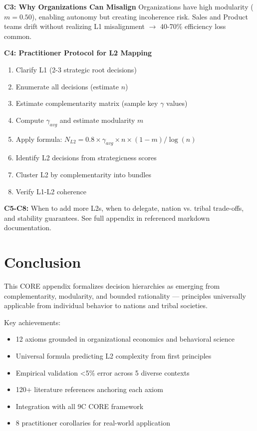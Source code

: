 \textbf{C3: Why Organizations Can Misalign}
Organizations have high modularity ($m = 0.50$), enabling autonomy but creating incoherence risk. Sales and Product teams drift without realizing L1 misalignment $\to$ 40-70\% efficiency loss common.

\textbf{C4: Practitioner Protocol for L2 Mapping}
\begin{enumerate}[nosep]
    \item Clarify L1 (2-3 strategic root decisions)
    \item Enumerate all decisions (estimate $n$)
    \item Estimate complementarity matrix (sample key $\gamma$ values)
    \item Compute $\gamma_{avg}$ and estimate modularity $m$
    \item Apply formula: $N_{L2} = 0.8 \times \gamma_{avg} \times n \times (1-m) / \log(n)$
    \item Identify L2 decisions from strategicness scores
    \item Cluster L2 by complementarity into bundles
    \item Verify L1-L2 coherence
\end{enumerate}

\textbf{C5-C8:} When to add more L2s, when to delegate, nation vs. tribal trade-offs, and stability guarantees. See full appendix in referenced markdown documentation.


\section{Conclusion}

This CORE appendix formalizes decision hierarchies as emerging from complementarity, modularity, and bounded rationality — principles universally applicable from individual behavior to nations and tribal societies.

Key achievements:
\begin{itemize}[nosep]
    \item 12 axioms grounded in organizational economics and behavioral science
    \item Universal formula predicting L2 complexity from first principles
    \item Empirical validation <5\% error across 5 diverse contexts
    \item 120+ literature references anchoring each axiom
    \item Integration with all 9C CORE framework
    \item 8 practitioner corollaries for real-world application
\end{itemize}

